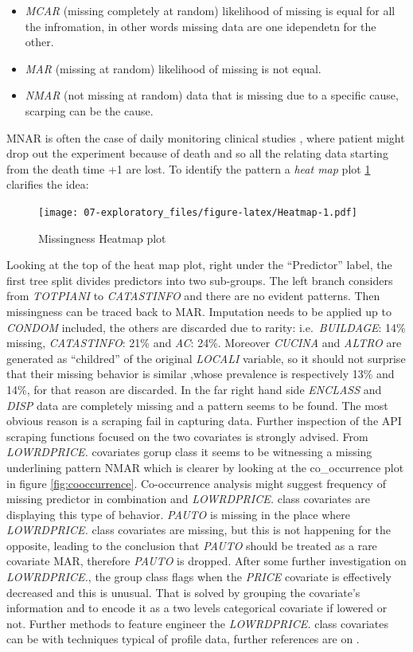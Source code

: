 \documentclass[
  12pt,
  a4paper,
  oneside]{book}
\providecommand{\tightlist}{%
  \setlength{\itemsep}{0pt}\setlength{\parskip}{0pt}}
\theoremstyle{definition}
\theoremstyle{definition}
\theoremstyle{definition}
\theoremstyle{remark}
\begin{document}
\begin{itemize}
\tightlist
\item
  \emph{MCAR} (missing completely at random) likelihood of missing is equal for all the infromation, in other words missing data are one idependetn for the other.
\item
  \emph{MAR} (missing at random) likelihood of missing is not equal.
\item
  \emph{NMAR} (not missing at random) data that is missing due to a specific cause, scarping can be the cause.
\end{itemize}

MNAR is often the case of daily monitoring clinical studies \citep{Kuhn}, where patient might drop out the experiment because of death and so all the relating data starting from the death time +1 are lost.
To identify the pattern a \emph{heat map} plot \ref{fig:Heatmap} clarifies the idea:

\begin{figure}
\centering
\texttt{[image: 07-exploratory\_files/figure-latex/Heatmap-1.pdf]}
\caption{\label{fig:Heatmap}Missingness Heatmap plot}
\end{figure}

Looking at the top of the heat map plot, right under the ``Predictor'' label, the first tree split divides predictors into two sub-groups. The left branch considers from \emph{TOTPIANI} to \emph{CATASTINFO} and there are no evident patterns. Then missingness can be traced back to MAR. Imputation needs to be applied up to \emph{CONDOM} included, the others are discarded due to rarity: i.e.~\emph{BUILDAGE}: 14\% missing, \emph{CATASTINFO}: 21\% and \emph{AC}: 24\%. Moreover \emph{CUCINA} and \emph{ALTRO} are generated as ``childred'' of the original \emph{LOCALI} variable, so it should not surprise that their missing behavior is similar ,whose prevalence is respectively 13\% and 14\%, for that reason are discarded.
In the far right hand side \emph{ENCLASS} and \emph{DISP} data are completely missing and a pattern seems to be found. The most obvious reason is a scraping fail in capturing data. Further inspection of the API scraping functions focused on the two covariates is strongly advised. From \emph{LOWRDPRICE.} covariates gorup class it seems to be witnessing a missing underlining pattern NMAR which is clearer by looking at the co\_occurrence plot in figure \ref{fig:cooccurrence}. Co-occurrence analysis might suggest frequency of missing predictor in combination and \emph{LOWRDPRICE.} class covariates are displaying this type of behavior. \emph{PAUTO} is missing in the place where \emph{LOWRDPRICE.} class covariates are missing, but this is not happening for the opposite, leading to the conclusion that \emph{PAUTO} should be treated as a rare covariate MAR, therefore \emph{PAUTO} is dropped.
After some further investigation on \emph{LOWRDPRICE.}, the group class flags when the \emph{PRICE} covariate is effectively decreased and this is unusual. That is solved by grouping the covariate's information and to encode it as a two levels categorical covariate if lowered or not. Further methods to feature engineer the \emph{LOWRDPRICE.} class covariates can be with techniques typical of profile data, further references are on \citet{Kuhn}.
\end{document}
